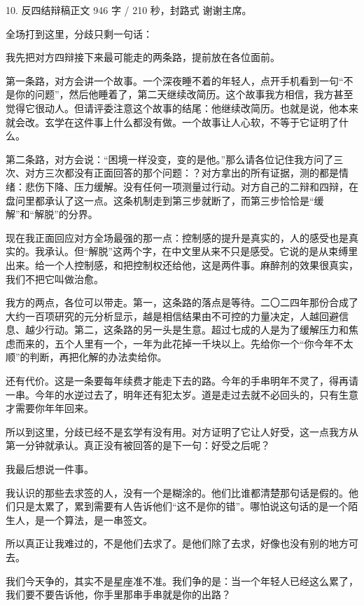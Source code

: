\documentclass[script,con]{debate}
\begin{document}
\begin{speech}{10. 反四结辩稿}{正文 946 字 / 210 秒，封路式}
谢谢主席。

全场打到这里，分歧只剩一句话：

我先把对方四辩接下来最可能走的两条路，提前放在各位面前。

第一条路，对方会讲一个故事。一个深夜睡不着的年轻人，点开手机看到一句“不是你的问题”，然后他睡着了，第二天继续改简历。这个故事我方相信，我方甚至觉得它很动人。但请评委注意这个故事的结尾：他继续改简历。也就是说，他本来就会改。玄学在这件事上什么都没有做。一个故事让人心软，不等于它证明了什么。

第二条路，对方会说：“困境一样没变，变的是他。”那么请各位记住我方问了三次、对方三次都没有正面回答的那个问题：？对方拿出的所有证据，测的都是情绪：悲伤下降、压力缓解。没有任何一项测量过行动。对方自己的二辩和四辩，在盘问里都承认了这一点。这条机制走到第三步就断了，而第三步恰恰是“缓解”和“解脱”的分界。

现在我正面回应对方全场最强的那一点：控制感的提升是真实的，人的感受也是真实的。我承认。但“解脱”这两个字，在中文里从来不只是感受。它说的是从束缚里出来。给一个人控制感，和把控制权还给他，这是两件事。麻醉剂的效果很真实，我们不把它叫做治愈。

我方的两点，各位可以带走。第一，这条路的落点是等待。二〇二四年那份合成了大约一百项研究的元分析显示，越是相信结果由不可控的力量决定，人越回避信息、越少行动。第二，这条路的另一头是生意。超过七成的人是为了缓解压力和焦虑而来的，五个人里有一个，一年为此花掉一千块以上。先给你一个“你今年不太顺”的判断，再把化解的办法卖给你。

还有代价。这是一条要每年续费才能走下去的路。今年的手串明年不灵了，得再请一串。今年的水逆过去了，明年还有犯太岁。道是走过去就不必回头的，只有生意才需要你年年回来。

所以到这里，分歧已经不是玄学有没有用。对方证明了它让人好受，这一点我方从第一分钟就承认。真正没有被回答的是下一句：好受之后呢？

我最后想说一件事。

我认识的那些去求签的人，没有一个是糊涂的。他们比谁都清楚那句话是假的。他们只是太累了，累到需要有人告诉他们“这不是你的错”。哪怕说这句话的是一个陌生人，是一个算法，是一串签文。

所以真正让我难过的，不是他们去求了。是他们除了去求，好像也没有别的地方可去。

我们今天争的，其实不是星座准不准。我们争的是：当一个年轻人已经这么累了，我们要不要告诉他，你手里那串手串就是你的出路？


\end{speech}
\end{document}
